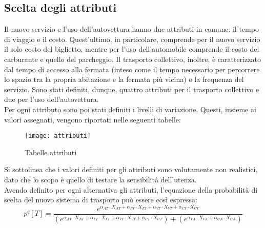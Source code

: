 \documentclass{article}
\begin{document}
\subsection{Scelta degli attributi}
Il nuovo servizio e l’uso dell’autovettura hanno due attributi in comune: il tempo di viaggio e il costo. Quest’ultimo, in particolare, comprende per il nuovo servizio il solo costo del biglietto, mentre per l’uso dell’automobile comprende il costo del carburante e quello del parcheggio. Il trasporto collettivo, inoltre, è caratterizzato dal tempo di accesso alla fermata (inteso come il tempo necessario per percorrere lo spazio tra la propria abitazione e la fermata più vicina) e la frequenza del servizio. Sono stati definiti, dunque, quattro attributi per il trasporto collettivo e due per l’uso dell’autovettura.\\
Per ogni attributo sono poi stati definiti i livelli di variazione. Questi, insieme ai valori assegnati, vengono riportati nelle seguenti tabelle: 
\begin{figure}[H]
\centering
\texttt{[image: attributi]}
\caption{Tabelle attributi}
\end{figure}
\label{figura 13}
Si sottolinea che i valori definiti per gli attributi sono volutamente non realistici, dato che lo scopo è quello di testare la sensibilità dell’utenza.\\
Avendo definito per ogni alternativa gli attributi, l’equazione della probabilità di scelta del nuovo sistema di trasporto può essere così espressa:
\begin{equation}
p^{q}[T]=\frac{e^{\alpha_{AT}\cdot X_{AT}+\alpha_{FT}\cdot X_{FT}+\alpha_{VT}\cdot X_{VT}+\alpha_{CT}\cdot X_{CT}}}{(e^{\alpha_{AT}\cdot X_{AT}+\alpha_{FT}\cdot X_{FT}+\alpha_{VT}\cdot X_{VT}+\alpha_{CT}\cdot X_{CT}})+(e^{\alpha_{VA}\cdot X_{VA}+\alpha_{CA}\cdot X_{CA}})}
\end{equation}
\end{document}
